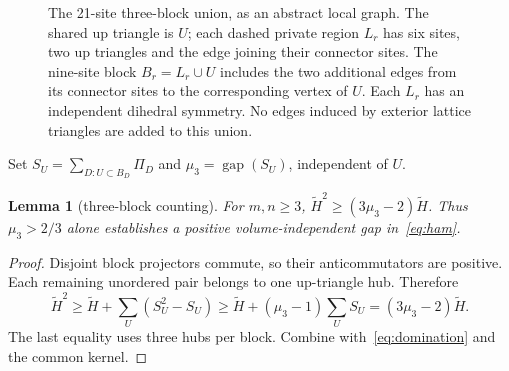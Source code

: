 \documentclass[11pt,a4paper]{article}
\newtheorem{lemma}[theorem]{Lemma}\newtheorem{proposition}[theorem]{Proposition}
\theoremstyle{remark}\newtheorem{remark}[theorem]{Remark}
\newcommand{\gap}{\operatorname{gap}}\newcommand{\ran}{\operatorname{ran}}
\newcommand{\Hb}{\widetilde H}\newcommand{\Dstar}{\Delta_*}
\begin{document}
\begin{figure}[ht]\centering
{}
\caption{The 21-site three-block union, as an abstract local graph. The shared up triangle is $U$; each dashed private region $L_r$ has six sites, two up triangles and the edge joining their connector sites. The nine-site block $B_r=L_r\cup U$ includes the two additional edges from its connector sites to the corresponding vertex of $U$. Each $L_r$ has an independent dihedral symmetry. No edges induced by exterior lattice triangles are added to this union.}\label{fig:hub}
\end{figure}

Set $S_U=\sum_{D:U\subset B_D}\Pi_D$ and $\mu_3=\gap(S_U)$, independent of $U$.
\begin{lemma}[three-block counting]\label{lem:count}
For $m,n\ge3$, $\Hb^2\ge(3\mu_3-2)\Hb$. Thus $\mu_3>2/3$ alone establishes a positive volume-independent gap in~\eqref{eq:ham}.
\end{lemma}
\begin{proof}
Disjoint block projectors commute, so their anticommutators are positive. Each remaining unordered pair belongs to one up-triangle hub. Therefore
\[
 \Hb^2\ge\Hb+\sum_U(S_U^2-S_U)
 \ge\Hb+(\mu_3-1)\sum_US_U=(3\mu_3-2)\Hb.
\]
The last equality uses three hubs per block. Combine with~\eqref{eq:domination} and the common kernel.
\end{proof}
\end{document}
